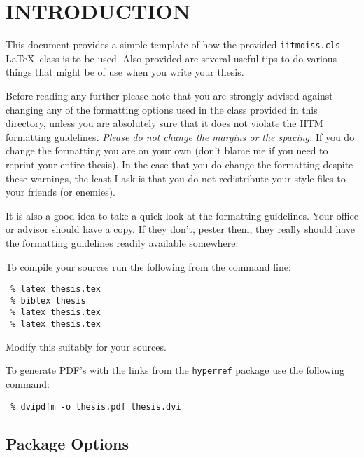 \documentclass[BTech]{iitmdiss}
\begin{document}
 \pagebreak
 \clearpage




 \chapter{INTRODUCTION}
 \label{chap:intro}
 
 This document provides a simple template of how the provided
 \verb+iitmdiss.cls+ \LaTeX\ class is to be used.  Also provided are
 several useful tips to do various things that might be of use when you
 write your thesis.
 
 Before reading any further please note that you are strongly advised
 against changing any of the formatting options used in the class
 provided in this directory, unless you are absolutely sure that it
 does not violate the IITM formatting guidelines.  \emph{Please do not
   change the margins or the spacing.}  If you do change the formatting
 you are on your own (don't blame me if you need to reprint your entire
 thesis).  In the case that you do change the formatting despite these
 warnings, the least I ask is that you do not redistribute your style
 files to your friends (or enemies).
 
 It is also a good idea to take a quick look at the formatting
 guidelines.  Your office or advisor should have a copy.  If they
 don't, pester them, they really should have the formatting guidelines
 readily available somewhere.
 
 To compile your sources run the following from the command line:
 \begin{verbatim}
 % latex thesis.tex
 % bibtex thesis
 % latex thesis.tex
 % latex thesis.tex
 \end{verbatim}
 Modify this suitably for your sources.
 
 To generate PDF's with the links from the \verb+hyperref+ package use
 the following command:
 \begin{verbatim}
 % dvipdfm -o thesis.pdf thesis.dvi
 \end{verbatim}
 
 \section{Package Options}
 
\end{document}
